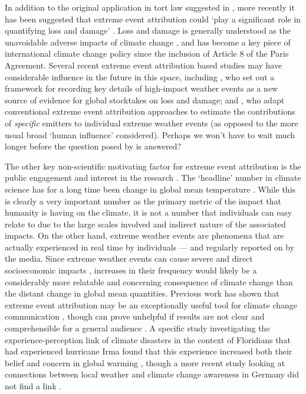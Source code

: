   In addition to the original application in tort law suggested in \citet{allen_liability_2003}, more recently it has been suggested that extreme event attribution could `play a significant role in quantifying loss and damage' \citep{wehner_operational_2022}. Loss and damage is generally understood as the unavoidable adverse impacts of climate change \citep{mace_loss_2016}, and has become a key piece of international climate change policy since the inclusion of Article 8 of the Paris Agreement. Several recent extreme event attribution based studies may have considerable influence in the future in this space, including \citet{clarke_inventories_2021}, who set out a framework for recording key details of high-impact weather events as a new source of evidence for global stocktakes on loss and damage; and \citet{otto_assigning_2017,lott_quantifying_2021}, who adapt conventional extreme event attribution approaches to estimate the contributions of \emph{specific} emitters to individual extreme weather events (as opposed to the more usual broad `human influence' considered). Perhaps we won't have to wait much longer before the question posed by \citeauthor{allen_liability_2003} is answered?

  The other key non-scientific motivating factor for extreme event attribution is the public engagement and interest in the research  \citep{swain_attributing_2020}. The `headline' number in climate science has for a long time been change in global mean temperature \citep{stocker_climate_2013,ipcc_global_2018,masson-delmotte_climate_2021}. While this is clearly a very important number as the primary metric of the impact that humanity is having on the climate, it is not a number that individuals can easy relate to due to the large scales involved and indirect nature of the associated impacts. On the other hand, extreme weather events are phenomena that are actually experienced in real time by individuals --- and regularly reported on by the media. Since extreme weather events can cause severe and direct socioeconomic impacts \citep{fouillet_excess_2006}, increases in their frequency would likely be a considerably more relatable and concerning consequence of climate change than the distant change in global mean quantities. Previous work has shown that extreme event attribution may be an exceptionally useful tool for climate change communication \citep{ettinger_whats_2021}, though can prove unhelpful if results are not clear and comprehensible for a general audience \citep[for example if different attribution studies regarding a single event appear to provide conflicting headline results][]{osaka_natural_2020}. A specific study investigating the experience-perception link of climate disasters in the context of Floridians that had experienced hurricane Irma found that this experience increased both their belief and concern in global warming \citep{bergquist_experiencing_2019}, though a more recent study looking at connections between local weather and climate change awareness in Germany did not find a link \citep{gartner_experiencing_2021}.

